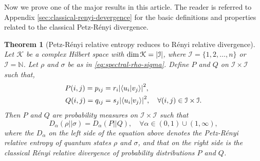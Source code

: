 \documentclass[12pt,a4paper,oneside]{article}
\numberwithin{equation}{section}
\theoremstyle{definition}  %
\theoremstyle{plain}  %
\newtheorem{thm}[defn]{Theorem}
\theoremstyle{remark} %
\newcommand{\CK}{\mathcal{K}}
\newcommand{\BN}{\mathbb{N}}
\begin{document}
Now we prove one of the major results in this article. The reader is referred to Appendix \ref{sec:classical-renyi-devergence} for the basic definitions and properties related to the classical Petz-R\'enyi divergence.
\begin{thm}[Petz-R\'enyi relative entropy reduces to R\'enyi relative divergence]\label{thm:quantum-reduces-to-classical}
Let $\CK$ be a complex Hilbert space with  $\dim \CK = \abs{\mathcal{I}}$, where $\mathcal{I} =\{1,2,\dots,n\}$ or $\mathcal{I}=\BN$. 
Let $\rho$ and $\sigma$ be as in \eqref{eq:spectral-rho-sigma}.  
 Define $P$ and $Q$ on $\mathcal{I}\times \mathcal{I}$ such that,
\begin{align}
    \label{eq:P-and-Q}\begin{split}
  P(i,j)=  p_{ij} &= r_i\abs{\braket{u_i}{v_j}}^2,\\
  Q(i,j)=  q_{ij}& = s_j\abs{\braket{u_i}{v_j}}^2, \quad \forall (i,j)\in \mathcal{I}\times\mathcal{I}.
     \end{split}
\end{align} Then $P$ and $Q$ are probability measures on $\mathcal{I}\times \mathcal{I}$ such that \begin{equation}\label{eq:main-result}
  D_{\alpha}(\rho||\sigma) = D_{\alpha}(P||Q) ,\quad \forall \alpha\in (0,1)\cup(1,\infty),
\end{equation}
where the $D_\alpha$ on the left side of the equation above denotes the Petz-R\'enyi relative entropy of quantum states $\rho$ and  $\sigma$, and that on the right side is the classical R\'enyi relative divergence of probability distributions $P$ and $Q$.
\end{thm}
\end{document}
